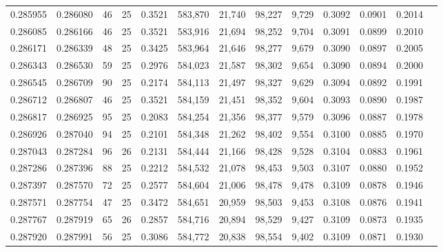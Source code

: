 \begin{tabular}{rrrrrrrrrrrrr}
0.285955 & 0.286080 &  46 &  25 &                                     0.3521 & 583,870 &  21,740 &  98,227 &   9,729 & 0.3092 & 0.0901 & 0.2014 \\
0.286085 & 0.286166 &  46 &  25 &                                     0.3521 & 583,916 &  21,694 &  98,252 &   9,704 & 0.3091 & 0.0899 & 0.2010 \\
0.286171 & 0.286339 &  48 &  25 &                                     0.3425 & 583,964 &  21,646 &  98,277 &   9,679 & 0.3090 & 0.0897 & 0.2005 \\
0.286343 & 0.286530 &  59 &  25 &                                     0.2976 & 584,023 &  21,587 &  98,302 &   9,654 & 0.3090 & 0.0894 & 0.2000 \\
0.286545 & 0.286709 &  90 &  25 &                                     0.2174 & 584,113 &  21,497 &  98,327 &   9,629 & 0.3094 & 0.0892 & 0.1991 \\
0.286712 & 0.286807 &  46 &  25 &                                     0.3521 & 584,159 &  21,451 &  98,352 &   9,604 & 0.3093 & 0.0890 & 0.1987 \\
0.286817 & 0.286925 &  95 &  25 &                                     0.2083 & 584,254 &  21,356 &  98,377 &   9,579 & 0.3096 & 0.0887 & 0.1978 \\
0.286926 & 0.287040 &  94 &  25 &                                     0.2101 & 584,348 &  21,262 &  98,402 &   9,554 & 0.3100 & 0.0885 & 0.1970 \\
0.287043 & 0.287284 &  96 &  26 &                                     0.2131 & 584,444 &  21,166 &  98,428 &   9,528 & 0.3104 & 0.0883 & 0.1961 \\
0.287286 & 0.287396 &  88 &  25 &                                     0.2212 & 584,532 &  21,078 &  98,453 &   9,503 & 0.3107 & 0.0880 & 0.1952 \\
0.287397 & 0.287570 &  72 &  25 &                                     0.2577 & 584,604 &  21,006 &  98,478 &   9,478 & 0.3109 & 0.0878 & 0.1946 \\
0.287571 & 0.287754 &  47 &  25 &                                     0.3472 & 584,651 &  20,959 &  98,503 &   9,453 & 0.3108 & 0.0876 & 0.1941 \\
0.287767 & 0.287919 &  65 &  26 &                                     0.2857 & 584,716 &  20,894 &  98,529 &   9,427 & 0.3109 & 0.0873 & 0.1935 \\
0.287920 & 0.287991 &  56 &  25 &                                     0.3086 & 584,772 &  20,838 &  98,554 &   9,402 & 0.3109 & 0.0871 & 0.1930 \\

\end{tabular}
